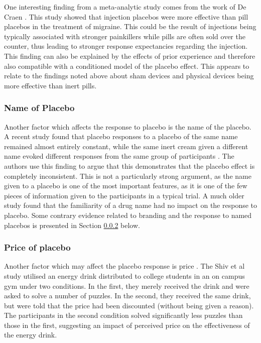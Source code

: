 One interesting finding from a meta-analytic study comes from the work of De Craen \cite{Craen2000}. This study showed that injection placebos were more effective than pill placebos in the treatment of migraine. This could be the result of injections being typically associated with stronger painkillers while pills are often sold over the counter, thus leading to stronger response expectancies regarding the injection. This finding can also be explained by the effects of prior experience and therefore also compatible with a conditioned model of the placebo effect. This appears to relate to the findings noted above about sham devices and physical devices being more effective than inert pills. 

\subsubsection{Name of Placebo}
\label{sec:name-placebo}



Another factor which affects the response to placebo is the name of the placebo. A recent study found that placebo responses to a placebo of the same name remained almost entirely constant, while the same inert cream given a different name evoked different responses from the same group of participants \cite{Whalley2008}. The authors use this finding to argue that this demonstrates that the placebo effect is completely inconsistent. This is not a particularly strong argument, as the name given to a placebo is one of the most important features, as it is one of the few pieces of information given to the participants in a typical trial. A much older study \cite{Morris1974} found that the familiarity of a drug name had no impact on the response to placebo. Some contrary evidence related to branding and the response to named placebos is presented in Section \ref{sec:price} below. 


\subsubsection{Price of placebo}
\label{sec:price}

Another factor which may affect the placebo response is price \cite{Shiv2005a}. The Shiv et al study utilised an energy drink distributed to college students in an on campus gym under two conditions. In the first, they merely received the drink and were asked to solve a number of puzzles. In the second, they received the same drink, but were told that the price had been discounted (without being given a reason). The participants in the second condition solved significantly less puzzles than those in the first, suggesting an impact of perceived price on the effectiveness of the energy drink. 

